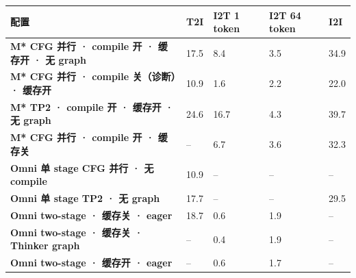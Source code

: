 \begin{tabularx}{\textwidth}{>{\bfseries}p{5.2cm} Y Y Y Y}
\toprule
{}
配置 & T2I & I2T 1 token & I2T 64 token & I2I \\
\midrule
M* CFG 并行 · compile 开 · 缓存开 · 无 graph & 17.5 & 8.4 & 3.5 & 34.9 \\
M* CFG 并行 · compile 关（诊断）· 缓存开 & 10.9 & 1.6 & 2.2 & 22.0 \\
M* TP2 · compile 开 · 缓存开 · 无 graph & 24.6 & 16.7 & 4.3 & 39.7 \\
M* CFG 并行 · compile 开 · 缓存关 & -- & 6.7 & 3.6 & 32.3 \\
Omni 单 stage CFG 并行 · 无 compile & 10.9 & -- & -- & -- \\
Omni 单 stage TP2 · 无 graph & 17.7 & -- & -- & 29.5 \\
Omni two-stage · 缓存关 · eager & 18.7 & 0.6 & 1.9 & -- \\
Omni two-stage · 缓存关 · Thinker graph & -- & 0.4 & 1.9 & -- \\
Omni two-stage · 缓存开 · eager & -- & 0.6 & 1.7 & -- \\
\bottomrule
\end{tabularx}
